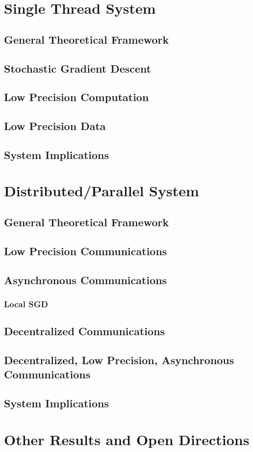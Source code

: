 \documentclass[examplefnt,biber]{nowfnt}
\begin{document}
\chapter{Single Thread System}

\section{General Theoretical Framework}

\section{Stochastic Gradient
Descent}

\section{Low Precision Computation}

\section{Low Precision Data}

\section{System Implications}

\chapter{Distributed/Parallel System}

\section{General Theoretical Framework}

\section{Low Precision 
Communications}

\section{Asynchronous Communications}


\subsection{Local SGD}

\section{Decentralized Communications}


\section{Decentralized, Low Precision, Asynchronous Communications}

\section{System Implications}

\chapter{Other Results and Open Directions}


\backmatter  
\printbibliography
\end{document}
